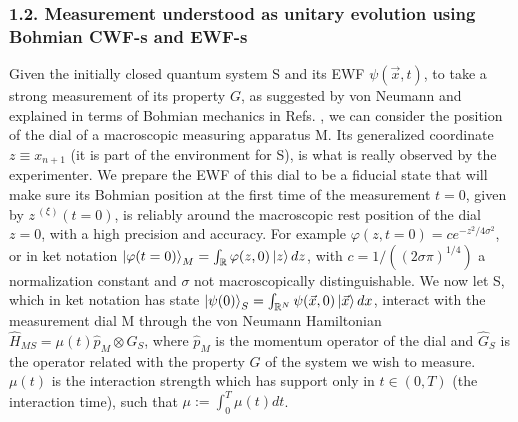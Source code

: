 \documentclass[11pt, a4paper]{article} %
\newcommand{\R}{\mathbb{R}} %
\begin{document}
\subsubsection*{1.2. Measurement understood as unitary evolution using Bohmian CWF-s and EWF-s}
\vspace{-0.1cm}
Given the initially closed quantum system S and its EWF $\psi(\vec{x},t)$, to take a strong measurement of its property $G$, as suggested by von Neumann \cite{vonNeumann} and explained in terms of Bohmian mechanics in Refs. \cite{Durr, JordiXavier, Holland}, we can consider the position of the dial of a macroscopic measuring apparatus M. Its generalized coordinate $z\equiv x_{n+1}$ (it is part of the environment for S), is what is really observed by the experimenter. We prepare the EWF of this dial to be a fiducial state that will make sure its Bohmian position at the first time of the measurement $t=0$, given by $z^{\:(\xi)}(t=0)$, is reliably around the macroscopic rest position of the dial $z=0$, with a high precision and accuracy. For example $\varphi(z,t=0)=c e^{-z^2/4\sigma^2}$, or in ket notation $\ket{\varphi(t=0)}_M=\int_\R\varphi(z,0) \ket{z}dz$,  with $c=1/((2\sigma\pi)^{1/4})$ a normalization constant and $\sigma$ not macroscopically distinguishable. We now let S, which in ket notation has state $\ket{\psi(0)}_S=\int_{\R^N}\psi(\vec{x},0)\ket{\vec{x}}dx$, interact with the measurement dial M through the von Neumann Hamiltonian $\hat{H}_{MS}=\mu(t)\hat{p}_M\otimes \hat{G}_S$, where $\hat{p}_M$ is the momentum operator of the dial and $\hat{G}_S$ is the operator related with the property $G$ of the system we wish to measure. $\mu(t)$ is the interaction strength which has support only in $t\in(0,T)$ (the interaction time), such that $\mu:=\int_0^T\mu(t)dt$. 
\end{document}
